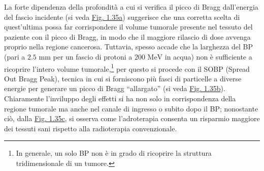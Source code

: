 \documentclass[12pt,a4paper,twoside]{report}
\begin{document}
	La forte dipendenza della profondità a cui si verifica il picco di Bragg dall'energia del fascio incidente (si veda \hyperref[fig:bragg_peak_energies]{Fig. 1.35a}) suggerisce che una corretta scelta di quest'ultima possa far corrispondere il volume tumorale presente nel tessuto del paziente con il picco di Bragg, in modo che il maggiore rilascio di dose avvenga proprio nella regione cancerosa. Tuttavia, spesso accade che la larghezza del BP (pari a $2.5\mbox{ mm}$ per un fascio di protoni a $200\mbox{ MeV}$ in acqua) non è sufficiente a ricoprire l'intero volume tumorale,\footnote{In generale, un solo BP non è in grado di ricoprire la struttura tridimensionale di un tumore.} per questo si procede con il SOBP (Spread Out Bragg Peak), tecnica in cui si forniscono più fasci di particelle a diverse energie per generare un picco di Bragg ``allargato'' (si veda \hyperref[fig:sobp]{Fig. 1.35b}). Chiaramente l'inviluppo degli effetti si ha non solo in corrispondenza della regione tumorale ma anche nel canale di ingresso o subito dopo il BP; nonostante ciò, dalla \hyperref[fig:critical_organ]{Fig. 1.35c}, si osserva come l'adroterapia consenta un risparmio maggiore dei tessuti sani rispetto alla radioterapia convenzionale.
\end{document}
